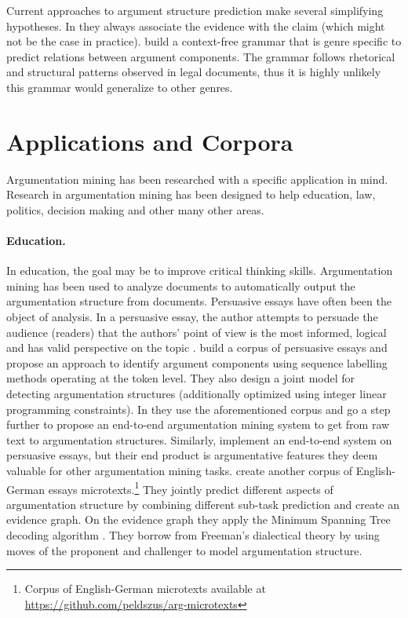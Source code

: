 
Current approaches to argument structure prediction make several simplifying
hypotheses. In \citep{aharoni2014benchmark} they always associate the evidence
with the claim (which might not be the case in practice).
\citet{palau2009argumentation} build a context-free grammar that is genre
specific to predict relations between argument components. The grammar follows
rhetorical and structural patterns observed in legal documents, thus it is
highly unlikely this grammar would generalize to other genres. 

\section{Applications and Corpora}
\label{sec:applications}

Argumentation mining has been researched with a specific application in mind.
Research in argumentation mining has been designed to help education, law, politics, decision
making and other many other areas. 

\paragraph{Education.} In education, the goal may be to improve critical
thinking skills.  Argumentation mining has been used to analyze documents to
automatically output the argumentation structure from documents.  Persuasive
essays have often been the object of analysis. In a persuasive essay, the
author attempts to persuade the audience (readers) that the authors' point of
view is the most informed, logical and has valid perspective on the topic
\citep{cabrio2018five}.  \citet{stab2017parsing} build a corpus of persuasive
essays and propose an approach to identify argument components
using sequence labelling methods operating at the token level. They also design
a joint model for detecting argumentation structures (additionally optimized
using integer linear programming constraints). In \citep{eger2017neural} they
use the aforementioned corpus and go a step further to propose an end-to-end
argumentation mining system to get from raw text to argumentation structures.
Similarly, \citet{nguyen2018argument} implement an end-to-end system on
persuasive essays, but their end product is argumentative features they deem
valuable for other argumentation mining tasks. \citet{peldszus2015joint}
create another corpus of English-German essays microtexts.\footnote{Corpus of
English-German microtexts available at
\url{https://github.com/peldszus/arg-microtexts}} They jointly predict
different aspects of argumentation structure by combining different sub-task
prediction and create an evidence graph. On the evidence graph they apply the
Minimum Spanning Tree decoding algorithm \citep{raidl2000weighted}.  They
borrow from Freeman's dialectical theory by using moves of the proponent and
challenger to model argumentation structure.

